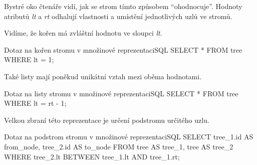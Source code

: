 Bystré oko čtenáře vidí, jak se strom tímto způsobem \enquote{ohodnocuje}. Hodnoty atributů \textit{lt} a \textit{rt} odhalují vlastnosti a umístění jednotlivých uzlů ve stromů.

\begin{upexample}
Vidíme, že kořen má zvláštní hodnotu ve sloupci \textit{lt}.

\begin{upcode}{Dotaz na kořen stromu v množinové reprezentaci}{}{SQL}
SELECT * FROM tree WHERE lt = 1;
\end{upcode}

Také listy mají poněkud unikátní vztah mezi oběma hodnotami.
\begin{upcode}{Dotaz na listy stromu v množinové reprezentaci}{}{SQL}
SELECT * FROM tree WHERE lt = rt - 1;
\end{upcode}

Velkou zbraní této reprezentace je určení podstromu určitého uzlu.
\begin{upcode}{Dotaz na podstrom stromu v množinové reprezentaci}{}{SQL}
SELECT	tree_1.id AS from_node, tree_2.id AS to_node
FROM	tree AS tree_1, tree AS tree_2
WHERE	tree_2.lt BETWEEN tree_1.lt AND tree_1.rt;
\end{upcode}
\end{upexample}
